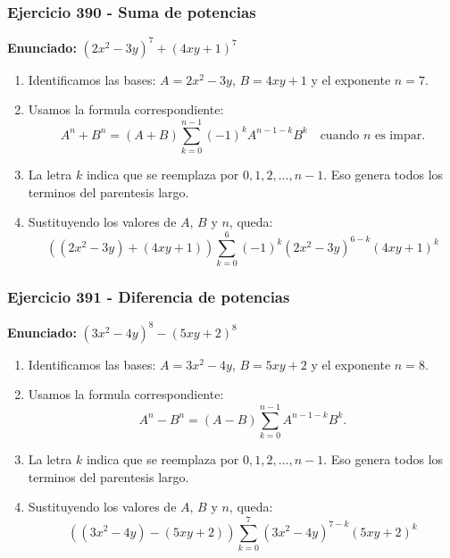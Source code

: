 \documentclass[11pt,a4paper]{article}
\begin{document}
\subsubsection*{Ejercicio 390 - Suma de potencias}
\textbf{Enunciado:} $ \left(2 x^{2} - 3 y\right)^{7}+\left(4 x y + 1\right)^{7} $\par
\begin{enumerate}[leftmargin=2em]
\item Identificamos las bases: \(A=2 x^{2} - 3 y\), \(B=4 x y + 1\) y el exponente \(n=7\).
\item Usamos la formula correspondiente: \[A^n+B^n=(A+B)\sum_{k=0}^{n-1}(-1)^kA^{n-1-k}B^k\quad\text{cuando }n\text{ es impar}.\]
\item La letra \(k\) indica que se reemplaza por \(0,1,2,\ldots,n-1\). Eso genera todos los terminos del parentesis largo.
\item Sustituyendo los valores de \(A\), \(B\) y \(n\), queda: \[\boxed{\left(\left(2 x^{2} - 3 y\right)+\left(4 x y + 1\right)\right)\sum_{k=0}^{6}(-1)^k\left(2 x^{2} - 3 y\right)^{6-k}\left(4 x y + 1\right)^k}\]
\end{enumerate}

\vspace{0.2cm}
\subsubsection*{Ejercicio 391 - Diferencia de potencias}
\textbf{Enunciado:} $ \left(3 x^{2} - 4 y\right)^{8}-\left(5 x y + 2\right)^{8} $\par
\begin{enumerate}[leftmargin=2em]
\item Identificamos las bases: \(A=3 x^{2} - 4 y\), \(B=5 x y + 2\) y el exponente \(n=8\).
\item Usamos la formula correspondiente: \[A^n-B^n=(A-B)\sum_{k=0}^{n-1}A^{n-1-k}B^k.\]
\item La letra \(k\) indica que se reemplaza por \(0,1,2,\ldots,n-1\). Eso genera todos los terminos del parentesis largo.
\item Sustituyendo los valores de \(A\), \(B\) y \(n\), queda: \[\boxed{\left(\left(3 x^{2} - 4 y\right)-\left(5 x y + 2\right)\right)\sum_{k=0}^{7}\left(3 x^{2} - 4 y\right)^{7-k}\left(5 x y + 2\right)^k}\]
\end{enumerate}

\vspace{0.2cm}
\end{document}
